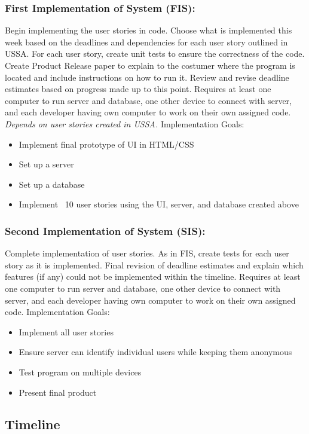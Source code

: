 \documentclass[12pt]{article}
\begin{document}
\subsubsection{First Implementation of System (FIS): }
Begin implementing the user stories in code. Choose what is implemented this
week based on the deadlines and dependencies for each user story outlined in
USSA. For each user story, create unit tests to ensure the correctness of the
code. Create Product Release paper to explain to the costumer where the program
is located and include instructions on how to run it. Review and revise deadline
estimates based on progress made up to this point. Requires at least one
computer to run server and database, one other device to connect with server,
and each developer having own computer to work on their own assigned code.
\textit{Depends on user stories created in USSA.}
Implementation Goals:
\begin{itemize}
  \item Implement final prototype of UI in HTML/CSS
  \item Set up a server
  \item Set up a database
  \item Implement ~10 user stories using the UI, server, and database created above
\end{itemize}

\subsubsection{Second Implementation of System (SIS):}
Complete implementation of user stories. As in FIS, create tests for each user
story as it is implemented. Final revision of deadline estimates and explain
which features (if any) could not be implemented within the timeline. Requires
at least one computer to run server and database, one other device to connect
with server, and each developer having own computer to work on their own
assigned code.
Implementation Goals:
\begin{itemize}
  \item Implement all user stories
  \item Ensure server can identify individual users while keeping them anonymous
  \item Test program on multiple devices
  \item Present final product
\end{itemize}

\subsection{Timeline}
\end{document}
